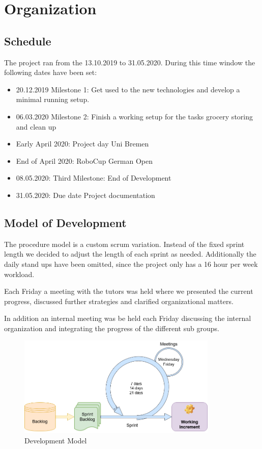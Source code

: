 \documentclass[main.tex]{subfiles}
\begin{document}
	\chapter{Organization}
	\label{organisation}
	
	\section{Schedule}
	The project ran from the 13.10.2019 to 31.05.2020. During this time window the following dates have been set:
	\begin{itemize}
		\item 20.12.2019 Milestone 1: Get used to the new technologies and develop a minimal running setup.
		\item 06.03.2020 Milestone 2: Finish a working setup for the tasks grocery storing and clean up
		\item Early April 2020: Project day Uni Bremen
		\item End of April 2020: RoboCup German Open
		\item 08.05.2020: Third Milestone: End of Development
		\item 31.05.2020: Due date Project documentation
	\end{itemize} 

	\section{Model of Development}
	The procedure model is a custom scrum variation. Instead of the fixed sprint length we decided to adjust the length of each sprint as needed. Additionally the daily stand ups have been omitted, since the project only has a 16 hour per week workload.
	
	Each Friday a meeting with the tutors was held where we presented the current progress, discussed further strategies and clarified organizational matters.
	
	In addition an internal meeting was be held each Friday discussing the internal organization and integrating the progress of the different sub groups.
	
	\begin{figure}[h]
		\centering
		\includegraphics[width=0.85\textwidth]{pictures/diagramms/Development-model.png}
		\caption{Development Model}
		\label{developmentmodel}
	\end{figure}
\end{document}
